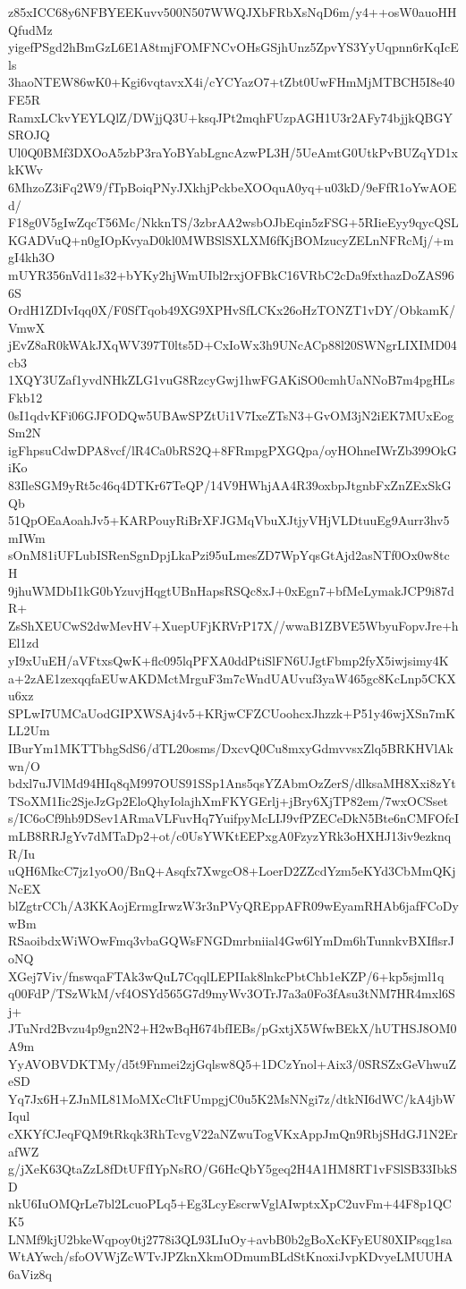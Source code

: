 z85xICC68y6NFBYEEKuvv500N507WWQJXbFRbXsNqD6m/y4++osW0auoHHQfudMz
yigefPSgd2hBmGzL6E1A8tmjFOMFNCvOHsGSjhUnz5ZpvYS3YyUqpnn6rKqIcEls
3haoNTEW86wK0+Kgi6vqtavxX4i/cYCYazO7+tZbt0UwFHmMjMTBCH5I8e40FE5R
RamxLCkvYEYLQlZ/DWjjQ3U+ksqJPt2mqhFUzpAGH1U3r2AFy74bjjkQBGYSROJQ
Ul0Q0BMf3DXOoA5zbP3raYoBYabLgncAzwPL3H/5UeAmtG0UtkPvBUZqYD1xkKWv
6MhzoZ3iFq2W9/fTpBoiqPNyJXkhjPckbeXOOquA0yq+u03kD/9eFfR1oYwAOEd/
F18g0V5gIwZqcT56Mc/NkknTS/3zbrAA2wsbOJbEqin5zFSG+5RIieEyy9qycQSL
KGADVuQ+n0gIOpKvyaD0kl0MWBSlSXLXM6fKjBOMzucyZELnNFRcMj/+mgI4kh3O
mUYR356nVd11s32+bYKy2hjWmUIbl2rxjOFBkC16VRbC2cDa9fxthazDoZAS966S
OrdH1ZDIvIqq0X/F0SfTqob49XG9XPHvSfLCKx26oHzTONZT1vDY/ObkamK/VmwX
jEvZ8aR0kWAkJXqWV397T0lts5D+CxIoWx3h9UNcACp88l20SWNgrLIXIMD04cb3
1XQY3UZaf1yvdNHkZLG1vuG8RzcyGwj1hwFGAKiSO0cmhUaNNoB7m4pgHLsFkb12
0sI1qdvKFi06GJFODQw5UBAwSPZtUi1V7IxeZTsN3+GvOM3jN2iEK7MUxEogSm2N
igFhpsuCdwDPA8vcf/lR4Ca0bRS2Q+8FRmpgPXGQpa/oyHOhneIWrZb399OkGiKo
83IleSGM9yRt5c46q4DTKr67TeQP/14V9HWhjAA4R39oxbpJtgnbFxZnZExSkGQb
51QpOEaAoahJv5+KARPouyRiBrXFJGMqVbuXJtjyVHjVLDtuuEg9Aurr3hv5mIWm
sOnM81iUFLubISRenSgnDpjLkaPzi95uLmesZD7WpYqsGtAjd2asNTf0Ox0w8tcH
9jhuWMDbI1kG0bYzuvjHqgtUBnHapsRSQc8xJ+0xEgn7+bfMeLymakJCP9i87dR+
ZsShXEUCwS2dwMevHV+XuepUFjKRVrP17X//wwaB1ZBVE5WbyuFopvJre+hEl1zd
yI9xUuEH/aVFtxsQwK+flc095lqPFXA0ddPtiSlFN6UJgtFbmp2fyX5iwjsimy4K
a+2zAE1zexqqfaEUwAKDMctMrguF3m7cWndUAUvuf3yaW465gc8KcLnp5CKXu6xz
SPLwI7UMCaUodGIPXWSAj4v5+KRjwCFZCUoohcxJhzzk+P51y46wjXSn7mKLL2Um
IBurYm1MKTTbhgSdS6/dTL20osms/DxcvQ0Cu8mxyGdmvvsxZlq5BRKHVlAkwn/O
bdxl7uJVlMd94HIq8qM997OUS91SSp1Ans5qsYZAbmOzZerS/dlksaMH8Xxi8zYt
TSoXM1Iic2SjeJzGp2EloQhyIolajhXmFKYGErlj+jBry6XjTP82em/7wxOCSset
s/IC6oCf9hb9DSev1ARmaVLFuvHq7YuifpyMcLIJ9vfPZECeDkN5Bte6nCMFOfcI
mLB8RRJgYv7dMTaDp2+ot/c0UsYWKtEEPxgA0FzyzYRk3oHXHJ13iv9ezknqR/Iu
uQH6MkcC7jz1yoO0/BnQ+Asqfx7XwgcO8+LoerD2ZZcdYzm5eKYd3CbMmQKjNcEX
blZgtrCCh/A3KKAojErmgIrwzW3r3nPVyQREppAFR09wEyamRHAb6jafFCoDywBm
RSaoibdxWiWOwFmq3vbaGQWsFNGDmrbniial4Gw6lYmDm6hTunnkvBXIflsrJoNQ
XGej7Viv/fnswqaFTAk3wQuL7CqqlLEPIIak8lnkcPbtChb1eKZP/6+kp5sjml1q
q00FdP/TSzWkM/vf4OSYd565G7d9myWv3OTrJ7a3a0Fo3fAsu3tNM7HR4mxl6Sj+
JTuNrd2Bvzu4p9gn2N2+H2wBqH674bfIEBs/pGxtjX5WfwBEkX/hUTHSJ8OM0A9m
YyAVOBVDKTMy/d5t9Fnmei2zjGqlsw8Q5+1DCzYnol+Aix3/0SRSZxGeVhwuZeSD
Yq7Jx6H+ZJnML81MoMXcCltFUmpgjC0u5K2MsNNgi7z/dtkNI6dWC/kA4jbWIqul
cXKYfCJeqFQM9tRkqk3RhTcvgV22aNZwuTogVKxAppJmQn9RbjSHdGJ1N2ErafWZ
g/jXeK63QtaZzL8fDtUFfIYpNsRO/G6HcQbY5geq2H4A1HM8RT1vFSlSB33IbkSD
nkU6IuOMQrLe7bl2LcuoPLq5+Eg3LcyEscrwVglAIwptxXpC2uvFm+44F8p1QCK5
LNMf9kjU2bkeWqpoy0tj2778i3QL93LIuOy+avbB0b2gBoXcKFyEU80XIPsqg1sa
WtAYwch/sfoOVWjZcWTvJPZknXkmODmumBLdStKnoxiJvpKDvyeLMUUHA6aViz8q
